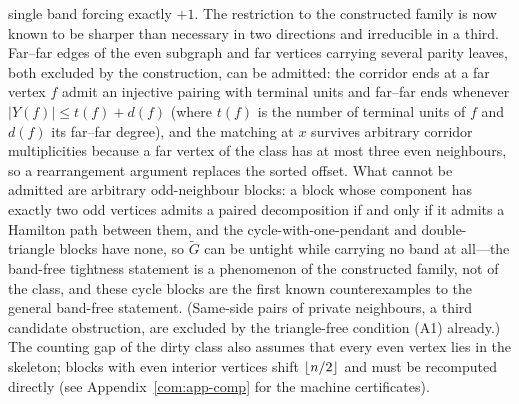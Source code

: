 \begin{remark}
single band forcing exactly $+1$. The restriction to the constructed
family is now known to be sharper than necessary in two directions and
irreducible in a third. Far--far edges of the even subgraph and far
vertices carrying several parity leaves, both excluded by the
construction, can be admitted: the corridor ends at a far vertex $f$
admit an injective pairing with terminal units and far--far ends whenever
$|Y(f)|\le t(f)+d(f)$ (where $t(f)$ is the number of terminal units of
$f$ and $d(f)$ its far--far degree), and the matching at $x$ survives
arbitrary corridor multiplicities because a far vertex of the class has at
most three even neighbours, so a rearrangement argument replaces the
sorted offset. What cannot be admitted are arbitrary odd-neighbour
blocks: a block whose component has exactly two odd vertices admits a
paired decomposition if and only if it admits a Hamilton path between
them, and the cycle-with-one-pendant and double-triangle blocks have
none, so $\tilde G$ can be untight while carrying no band at all---the
band-free tightness statement is a phenomenon of the constructed family,
not of the class, and these cycle blocks are the first known
counterexamples to the general band-free statement. (Same-side pairs of
private neighbours, a third candidate obstruction, are excluded by the
triangle-free condition {\rm(A1)} already.) The counting gap of the dirty
class also assumes that every even vertex lies in the skeleton; blocks
with even interior vertices shift $\left\lfloor n/2 \right\rfloor$ and must be recomputed
directly (see Appendix~\ref{com:app-comp} for the machine certificates).
\end{remark}

